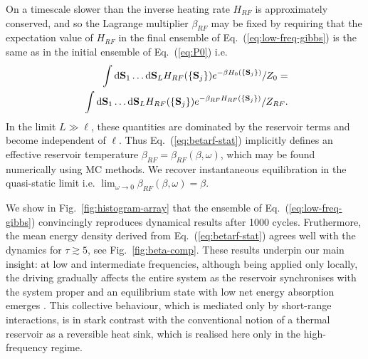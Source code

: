 \documentclass[prl,aps,twocolumn,notitlepage,10pt]{revtex4-1}
\def\d{\mathrm{d}}
\newcommand{\beA}{\begin{equation}\begin{aligned}}
\newcommand{\eeA}{\end{aligned}\end{equation}}
\begin{document}
On a timescale slower than the inverse heating rate $H_{RF}$ is approximately
conserved, and so the Lagrange multiplier $\beta_{RF}$ may be fixed by
requiring that the expectation value of $H_{RF}$ in the final ensemble of
Eq.~(\ref{eq:low-freq-gibbs}) is the same as in the initial ensemble of
Eq.~(\ref{eq:P0}) i.e.
\beA
\int \d {\bf S}_1 \dots \d {\bf S}_L
H_{RF}(\{ {\bf S}_j \} )
e^{-\beta H_0(\{ {\bf S}_j\})}/Z_0
=\\
\ \int \d {\bf S}_1 \dots \d {\bf S}_L
H_{RF}(\{ {\bf S}_j \} )
e^{-\beta_{RF} H_{RF}(\{{\bf S}_j \}) }/Z_{RF}
.
\label{eq:betarf-stat}
\eeA
In the limit $L\gg\ell$, these quantities are dominated by the reservoir terms
and become independent of $\ell$.
Thus Eq.~(\ref{eq:betarf-stat}) implicitly defines an effective reservoir
temperature $\beta_{RF} = \beta_{RF}(\beta, \omega)$, which may be found
numerically using MC methods.
We recover instantaneous equilibration in the quasi-static limit i.e.
$\lim_{\omega\to0} \beta_{RF}(\beta,\omega) = \beta$.

We show in Fig.~\ref{fig:histogram-array} that the ensemble of
Eq.~(\ref{eq:low-freq-gibbs}) convincingly reproduces dynamical results after
1000 cycles.
Fruthermore, the mean energy density derived from Eq.~(\ref{eq:betarf-stat})
agrees well with the dynamics for $\tau\gtrsim 5$, see
Fig.~\ref{fig:beta-comp}.
These results underpin our main insight: at low and intermediate frequencies,
although being applied only locally, the driving gradually affects the entire
system as the reservoir synchronises with the system proper and an equilibrium
state with low net energy absorption emerges \cite{long-paper}.
This collective behaviour, which is mediated only by short-range interactions,
is in stark contrast with the conventional notion of a thermal reservoir as a
reversible heat sink, which is realised here only in the high-frequency regime.
\end{document}

